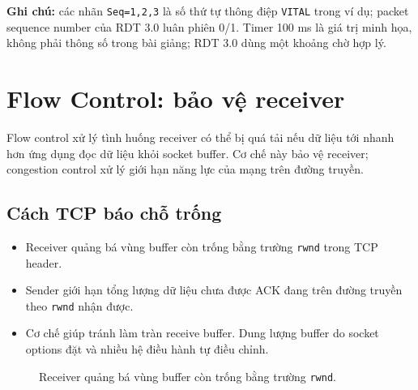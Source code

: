 \documentclass[11pt,a4paper]{article}
\begin{document}
\small
\textbf{Ghi chú:} các nhãn \texttt{Seq=1,2,3} là số thứ tự thông điệp \texttt{VITAL} trong ví dụ; packet sequence number của RDT 3.0 luân phiên 0/1. Timer 100 ms là giá trị minh họa, không phải thông số trong bài giảng; RDT 3.0 dùng một khoảng chờ hợp lý.

\clearpage
\section{Flow Control: bảo vệ receiver}
Flow control xử lý tình huống receiver có thể bị quá tải nếu dữ liệu tới nhanh hơn ứng dụng đọc dữ liệu khỏi socket buffer. Cơ chế này bảo vệ receiver; congestion control xử lý giới hạn năng lực của mạng trên đường truyền.
\subsection{Cách TCP báo chỗ trống}
\begin{itemize}
  \item Receiver quảng bá vùng buffer còn trống bằng trường \texttt{rwnd} trong TCP header.
  \item Sender giới hạn tổng lượng dữ liệu chưa được ACK đang trên đường truyền theo \texttt{rwnd} nhận được.
  \item Cơ chế giúp tránh làm tràn receive buffer. Dung lượng buffer do socket options đặt và nhiều hệ điều hành tự điều chỉnh.
\end{itemize}
\begin{figure}[H]
\centering
{}
\caption{Receiver quảng bá vùng buffer còn trống bằng trường \texttt{rwnd}.}
\label{fig:rwnd}
\end{figure}
\end{document}
